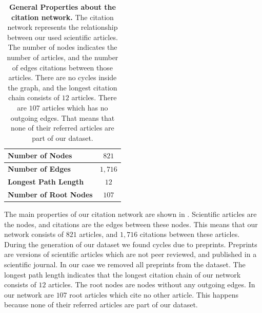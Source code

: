 \begin{table}[!b]
  \caption[General Properties about the citation network]{\textbf{General Properties about the citation network.} The citation network represents the relationship between our used scientific articles. The number of nodes indicates the number of articles, and the number of edges citations between those articles. There are no cycles inside the graph, and the longest citation chain consists of $12$ articles. There are $107$ articles which has no outgoing edges. That means that none of their referred articles are part of our dataset.}
  \centering
  \begin{tabular}{ l c }
    \toprule
    \textbf{Number of Nodes}      & $821$  \\ \midrule
    \textbf{Number of Edges}      & $1,716$ \\ \midrule
    \textbf{Longest Path Length}  & $12$   \\ \midrule
    \textbf{Number of Root Nodes} & $107$  \\
    \bottomrule
  \end{tabular}
  \label{tbl:general_properties_about_the_graph}
\end{table}

The main properties of our citation network are shown in . Scientific articles are the nodes, and citations are the edges between these nodes. This means that our network consists of $821$ articles, and $1,716$ citations between these articles. During the generation of our dataset we found cycles due to preprints. Preprints are versions of scientific articles which are not peer reviewed, and published in a scientific journal. In our case we removed all preprints from the dataset. The longest path length indicates that the longest citation chain of our network consists of $12$ articles. The root nodes are nodes without any outgoing edges. In our network are $107$ root articles which cite no other article. This happens because none of their referred articles are part of our dataset.

